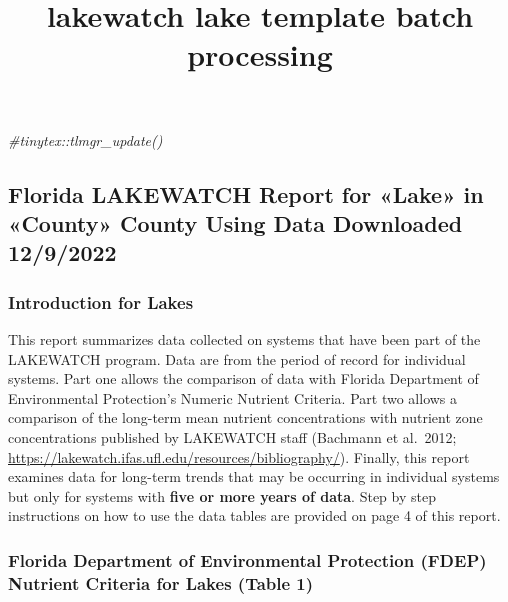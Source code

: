 \documentclass[
]{article}
\title{lakewatch lake template batch processing}
\author{}
\date{\vspace{-2.5em}}
\newenvironment{Shaded}{\begin{snugshade}}{\end{snugshade}}
\newcommand{\CommentTok}[1]{\textcolor[rgb]{0.56,0.35,0.01}{\textit{#1}}}
\begin{document}
\maketitle

\begin{Shaded}
\begin{Highlighting}[]
\CommentTok{\#tinytex::tlmgr\_update()}
\end{Highlighting}
\end{Shaded}

\hypertarget{florida-lakewatch-report-for-lake-in-county-county-using-data-downloaded-1292022}{%
\subsection{Florida LAKEWATCH Report for «Lake» in «County» County Using
Data Downloaded
12/9/2022}\label{florida-lakewatch-report-for-lake-in-county-county-using-data-downloaded-1292022}}

\hypertarget{introduction-for-lakes}{%
\subsubsection{Introduction for Lakes}\label{introduction-for-lakes}}

This report summarizes data collected on systems that have been part of
the LAKEWATCH program. Data are from the period of record for individual
systems. Part one allows the comparison of data with Florida Department
of Environmental Protection's Numeric Nutrient Criteria. Part two allows
a comparison of the long-term mean nutrient concentrations with nutrient
zone concentrations published by LAKEWATCH staff (Bachmann et al.~2012;
\url{https://lakewatch.ifas.ufl.edu/resources/bibliography/}). Finally,
this report examines data for long-term trends that may be occurring in
individual systems but only for systems with \textbf{five or more years
of data}. Step by step instructions on how to use the data tables are
provided on page 4 of this report.

\hypertarget{florida-department-of-environmental-protection-fdep-nutrient-criteria-for-lakes-table-1}{%
\subsubsection{Florida Department of Environmental Protection (FDEP)
Nutrient Criteria for Lakes (Table
1)}\label{florida-department-of-environmental-protection-fdep-nutrient-criteria-for-lakes-table-1}}
\end{document}
